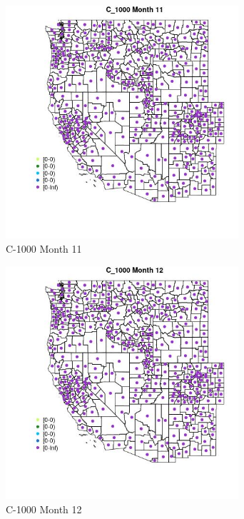 \begin{figure} 
\centering  
\includegraphics[width=0.77\textwidth]{Code_Outputs/df_report_ML_predictors_CountyCentroid_Locations_Dates_2008-01-01to2018-12-31_MapObsMo11C_1000.jpg} 
\caption{\label{fig:df_report_ML_predictors_CountyCentroid_Locations_Dates_2008-01-01to2018-12-31MapObsMo11C_1000}C-1000 Month 11} 
\end{figure} 
 

\clearpage 

\begin{figure} 
\centering  
\includegraphics[width=0.77\textwidth]{Code_Outputs/df_report_ML_predictors_CountyCentroid_Locations_Dates_2008-01-01to2018-12-31_MapObsMo12C_1000.jpg} 
\caption{\label{fig:df_report_ML_predictors_CountyCentroid_Locations_Dates_2008-01-01to2018-12-31MapObsMo12C_1000}C-1000 Month 12} 
\end{figure} 
 

